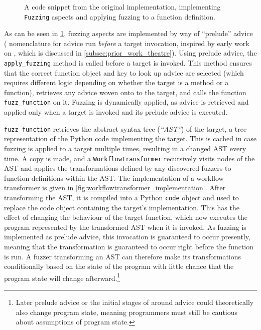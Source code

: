 \begin{figure}
    \centering
    
    \caption{A code snippet from the original \pdsf implementation, implementing
    \lstinline{Fuzzing} aspects and applying fuzzing to a function definition.}
    \label{fig:v1_pdsf_fuzzing_impl_codesnippet}
\end{figure}

As can be seen in \cref{fig:v1_pdsf_fuzzing_impl_codesnippet}, fuzzing aspects
are implemented by way of ``prelude'' advice (\pdsf{} nomenclature for advice
run \emph{before} a target invocation, inspired by early work on \theatreag{},
which is discussed in \cref{subsec:prior_work_theatre}). Using prelude advice,
the \lstinline{apply_fuzzing} method is called before a target is invoked. This
method ensures that the correct function object and key to look up advice are
selected (which requires different logic depending on whether the target is a
method or a function), retrieves any advice woven onto to the target, and calls
the function \lstinline{fuzz_function} on it. Fuzzing is dynamically applied, as
advice is retrieved and applied only when a target is invoked and its prelude
advice is executed.

\lstinline{fuzz_function} retrieves the abstract syntax tree
(\emph{``AST''}) of the target, a tree representation of the Python code
implementing the target. This is cached in case fuzzing is applied to a target
multiple times, resulting in a changed AST every time. A copy is made, and a
\lstinline{WorkflowTransformer} recursively visits nodes of the AST and applies
the transformations defined by any discovered fuzzers to function definitions
within the AST. The implementation of a workflow transformer is given in
\cref{fig:workflowtransformer_implementation}. After transforming the AST, it is
compiled into a Python \lstinline{code} object and used to replace the code
object containing the target's implementation. This has the effect of changing
the behaviour of the target function, which now executes the program represented
by the transformed AST when it is invoked. As fuzzing is implemented as prelude
advice, this invocation is guaranteed to occur presently, meaning that the
transformation is guaranteed to occur right before the function is run. A fuzzer
transforming an AST can therefore make its transformations conditionally based
on the state of the program with little chance that the program state will
change afterward.\footnote{Later prelude advice or the initial stages of around
advice could theoretically also change program state, meaning programmers must
still be cautious about assumptions of program state.}

